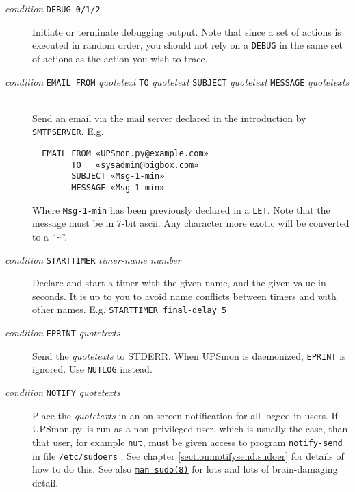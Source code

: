 \documentclass[12pt]{article}
\newcommand{\UPSmon}{\mbox{\textcolor{UPSMONCOLOUR}{UPSmon.py}}}
\newcommand{\LINman}[2]{\href{https://man7.org/linux/man-pages/man#2/#1.#2.html}{\texttt{man #1(#2)}}}
\begin{document}
\begin{description}
\begin{description}
\item[\textit{condition} \texttt{DEBUG 0/1/2}] \hspace{7mm} Initiate or terminate
debugging output.  Note that since a set of actions is executed in random
order, you should not rely on a \texttt{DEBUG} in the same set of actions as
the action you wish to trace.

\item[\textit{\small condition} \texttt{EMAIL FROM} \textit{quotetext} \texttt{TO}
  \textit{quotetext} \texttt{SUBJECT} \textit{quotetext} \texttt{MESSAGE}
  \textit{quotetexts}] \ \\ Send an email via the mail server declared in the
  introduction by \texttt{SMTPSERVER}.  E.g. 
  \begin{verbatim}
  EMAIL FROM «UPSmon.py@example.com»
        TO   «sysadmin@bigbox.com»
        SUBJECT «Msg-1-min»
        MESSAGE «Msg-1-min»\end{verbatim}
  Where \texttt{Msg-1-min} has been previously declared in a \texttt{LET}.
  Note that the message must be in 7-bit ascii.  Any character more exotic
  will be converted to a ``\texttt{\~}''.

\item[\textit{condition} \texttt{STARTTIMER} \textit{timer-name
    number}] \hspace{7mm} Declare and start a timer with the given name, and
  the given value in seconds.  It is up to you to avoid name conflicts between
  timers and with other names.  E.g. \texttt{STARTTIMER final-delay 5}

\item[\textit{condition} \texttt{EPRINT} \textit{quotetexts}] \hspace{7mm}
  Send the \textit{quotetexts} to STDERR.  When UPSmon is daemonized,
  \texttt{EPRINT} is ignored.  Use \texttt{NUTLOG} instead.

\item[\textit{condition} \texttt{NOTIFY} \textit{quotetexts}] \hspace{7mm}
  Place the \textit{quotetexts} in an on-screen notification for all logged-in
  users.  If \UPSmon\ is run as a non-privileged user, which is usually the
  case, than that user, for example \texttt{nut}, must be given access to
  program \texttt{notify-send} in file \texttt{/etc/sudoers} .  See chapter
  \ref{section:notifysend.sudoer} for details of how to do this.  See also
  \LINman{sudo}{8} for lots and lots of brain-damaging detail.


\end{description}
\end{description}
\end{document}
